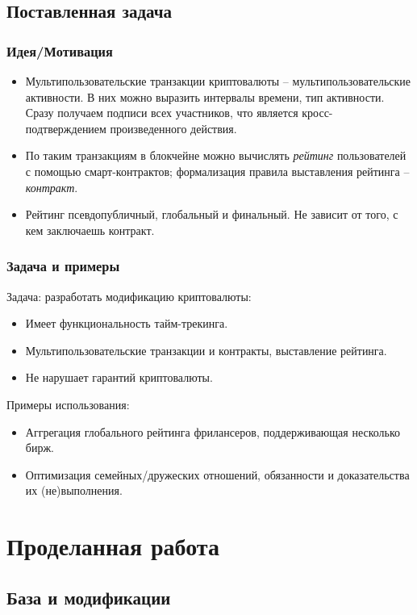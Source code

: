 \documentclass[11pt,handout,pdf,hyperref={unicode}]{beamer}
\begin{document}
\subsection{Поставленная задача}

\begin{frame}
  \frametitle{Идея/Мотивация}

  \begin{itemize}
  \item Мультипользовательские транзакции криптовалюты --
    мультипользовательские активности. В них можно выразить интервалы
    времени, тип активности. Сразу получаем подписи всех участников,
    что является кросс-подтверждением произведенного действия.
  \item По таким транзакциям в блокчейне можно вычислять
    \textit{рейтинг} пользователей с помощью смарт-контрактов;
    формализация правила выставления рейтинга -- \textit{контракт}.
  \item Рейтинг псевдопубличный, глобальный и финальный. Не зависит от
    того, с кем заключаешь контракт.
  \end{itemize}
\end{frame}

\begin{frame}
  \frametitle{Задача и примеры}
  Задача: разработать модификацию криптовалюты:
  \begin{itemize}
  \item Имеет функциональность тайм-трекинга.
  \item Мультипользовательские транзакции и контракты, выставление рейтинга.
  \item Не нарушает гарантий криптовалюты.
  \end{itemize}

  Примеры использования:
  \begin{itemize}
    \item Аггрегация глобального рейтинга фрилансеров, поддерживающая
      несколько бирж.
    \item Оптимизация семейных/дружеских отношений, обязанности и
      доказательства их (не)выполнения.
  \end{itemize}
\end{frame}

\section{Проделанная работа}

\subsection{База и модификации}
\end{document}
